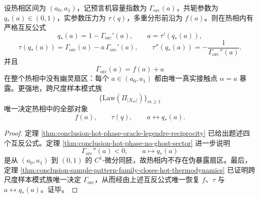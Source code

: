 \begin{theorem}[热相接触几何由样本模式族完全闭合]\label{thm:conclusion-sample-pattern-family-closes-hot-contact-geometry}
设热相区间为 \((a_0,a_1)\)，记预言机容量指数为 \(\Gamma_{\mathrm{orc}}(a)\)，共轭参数为 \(q_\ast(a)\in(0,1)\)，实参数压力为 \(\tau(q)\)，多重分形前沿为 \(f(a)\)。则在热相内有严格互反公式
\[
q_\ast(a)=1-\Gamma_{\mathrm{orc}}'(a),
\qquad
a=\tau'(q_\ast(a)),
\]
\[
\tau(q_\ast(a))
=
\Gamma_{\mathrm{orc}}(a)-a\,\Gamma_{\mathrm{orc}}'(a),
\qquad
\tau''(q_\ast(a))=-\frac{1}{\Gamma_{\mathrm{orc}}''(a)}.
\]
并且
\[
\Gamma_{\mathrm{orc}}(a)=f(a)+a
\]
在整个热相中没有幽灵扇区：每个 \(a\in(a_0,a_1)\) 都由唯一真实接触点 \(\alpha=a\) 暴露。更强地，跨尺度样本模式族
\[
\{\mathrm{Law}(\Pi_{|X_m|})\}_{m\ge 1}
\]
唯一决定热相中的全部对象
\[
f(a),
\qquad
\tau(q),
\qquad
a\longleftrightarrow q_\ast(a).
\]
\end{theorem}
\begin{proof}
定理 \ref{thm:conclusion-hot-phase-oracle-legendre-reciprocity} 已给出题述四个互反公式。定理 \ref{thm:conclusion-hot-phase-no-ghost-sector} 进一步说明
\[
\Gamma_{\mathrm{orc}}''(a)<0,
\qquad
a\longmapsto q_\ast(a)
\]
是从 \((a_0,a_1)\) 到 \((0,1)\) 的 \(C^1\)-微分同胚，故热相内不存在伪暴露扇区。最后，定理 \ref{thm:conclusion-sample-pattern-family-closes-hot-thermodynamics} 已证明跨尺度样本模式族唯一决定 \(\Gamma_{\mathrm{orc}}\)，从而经由上述互反公式唯一恢复 \(f\)、\(\tau\) 与 \(a\leftrightarrow q_\ast(a)\)。证毕。
\end{proof}

